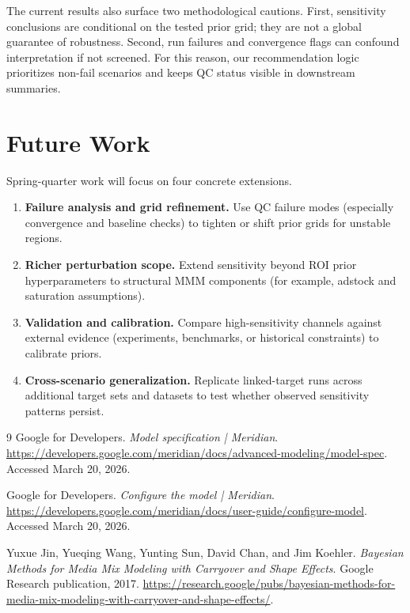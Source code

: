 ﻿\documentclass[11pt]{article}
\begin{document}
The current results also surface two methodological cautions. First, sensitivity conclusions are conditional on the tested prior grid; they are not a global guarantee of robustness. Second, run failures and convergence flags can confound interpretation if not screened. For this reason, our recommendation logic prioritizes non-fail scenarios and keeps QC status visible in downstream summaries.

\section{Future Work}
Spring-quarter work will focus on four concrete extensions.

\begin{enumerate}
  \item \textbf{Failure analysis and grid refinement.} Use QC failure modes (especially convergence and baseline checks) to tighten or shift prior grids for unstable regions.
  \item \textbf{Richer perturbation scope.} Extend sensitivity beyond ROI prior hyperparameters to structural MMM components (for example, adstock and saturation assumptions).
  \item \textbf{Validation and calibration.} Compare high-sensitivity channels against external evidence (experiments, benchmarks, or historical constraints) to calibrate priors.
  \item \textbf{Cross-scenario generalization.} Replicate linked-target runs across additional target sets and datasets to test whether observed sensitivity patterns persist.
\end{enumerate}

\begin{thebibliography}{9}
Google for Developers.
\newblock \emph{Model specification | Meridian}.
\newblock \url{https://developers.google.com/meridian/docs/advanced-modeling/model-spec}.
\newblock Accessed March 20, 2026.

Google for Developers.
\newblock \emph{Configure the model | Meridian}.
\newblock \url{https://developers.google.com/meridian/docs/user-guide/configure-model}.
\newblock Accessed March 20, 2026.

Yuxue Jin, Yueqing Wang, Yunting Sun, David Chan, and Jim Koehler.
\newblock \emph{Bayesian Methods for Media Mix Modeling with Carryover and Shape Effects}.
\newblock Google Research publication, 2017.
\newblock \url{https://research.google/pubs/bayesian-methods-for-media-mix-modeling-with-carryover-and-shape-effects/}.
\end{thebibliography}
\end{document}
